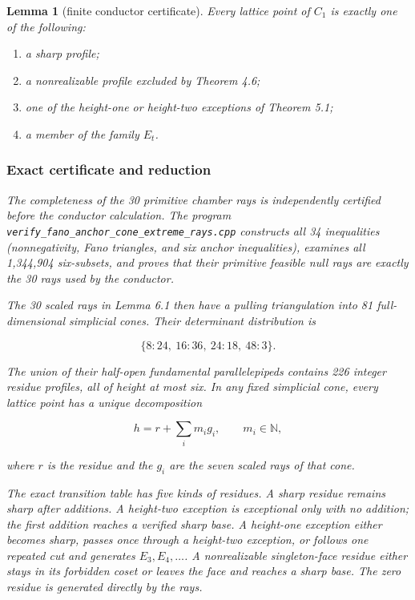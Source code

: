 \documentclass[11pt]{article}
\newtheorem{lemma}[theorem]{Lemma}
\theoremstyle{remark}
\numberwithin{equation}{section}
\begin{document}
\Needspace{0.28\textheight}
\begin{lemma}[finite conductor certificate]

Every lattice point of $C_1$ is exactly one of the following:

\begin{enumerate}
\item a sharp profile;
\item a nonrealizable profile excluded by Theorem 4.6;
\item one of the height-one or height-two exceptions of Theorem 5.1;
\item a member of the family $E_t$.

\end{enumerate}

\subsubsection*{Exact certificate and reduction}


The completeness of the 30 primitive chamber rays is independently certified
before the conductor calculation. The program
\nolinkurl{verify_fano_anchor_cone_extreme_rays.cpp} constructs all 34 inequalities
(nonnegativity, Fano triangles, and six anchor inequalities), examines all
1,344,904 six-subsets, and proves that their primitive feasible null rays are
exactly the 30 rays used by the conductor.

The 30 scaled rays in Lemma 6.1 then have a pulling triangulation into 81
full-dimensional simplicial cones. Their determinant distribution is

\nopagebreak[4]
\[
\{8:24,\ 16:36,\ 24:18,\ 48:3\}.
\tag{6.2}
\]

The union of their half-open fundamental parallelepipeds contains 226 integer
residue profiles, all of height at most six. In any fixed simplicial cone, every
lattice point has a unique decomposition

\nopagebreak[4]
\[
h=r+\sum_i m_i g_i,
\qquad m_i\in\mathbb N,
\tag{6.3}
\]

where $r$ is the residue and the $g_i$ are the seven scaled rays of that cone.

The exact transition table has five kinds of residues. A sharp residue remains
sharp after additions. A height-two exception is exceptional only with no
addition; the first addition reaches a verified sharp base. A height-one
exception either becomes sharp, passes once through a height-two exception, or
follows one repeated cut and generates $E_3,E_4,\ldots$. A nonrealizable
singleton-face residue either stays in its forbidden coset or leaves the face
and reaches a sharp base. The zero residue is generated directly by the rays.


\end{lemma}
\end{document}
